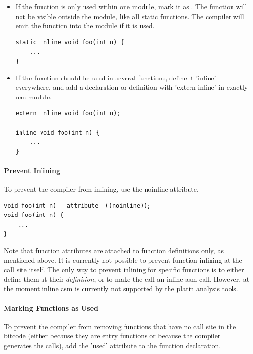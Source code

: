 \begin{itemize}
\item If the function is only used within one module, mark it as .
The function will not be visible outside the module, like all static functions. The compiler will emit the 
function into the module if it is used.

\begin{verbatim}
static inline void foo(int n) {
    ...
}
\end{verbatim}

\item If the function should be used in several functions, define it 'inline' everywhere,
  and add a declaration or definition with 'extern inline' in exactly one module.

\begin{verbatim}
extern inline void foo(int n);

inline void foo(int n) {
    ...
}
\end{verbatim}
\end{itemize}

\paragraph{Prevent Inlining}
To prevent the compiler from inlining, use the noinline attribute.

\begin{verbatim}
void foo(int n) __attribute__((noinline));
void foo(int n) {
    ...
}
\end{verbatim}

Note that function attributes are attached to function definitions only, as mentioned above.
It is currently not possible to prevent function inlining at the call site itself.
The only way to prevent inlining for specific functions is to either define them 
at their \emph{definition}, or to make the call an inline asm call. 
However, at the moment inline asm is currently not supported by the platin analysis tools. 


\paragraph{Marking Functions as Used}
To prevent the compiler from removing functions that have no call site in the bitcode
(either because they are entry functions or because the compiler generates the calls),
add the 'used' attribute to the function declaration.

